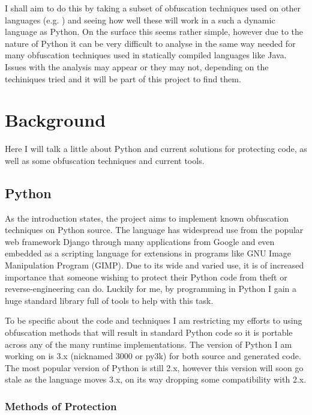 \documentclass{report}
\begin{document}
I shall aim to do this by taking a subset of obfuscation techniques used on other languages (e.g.
\cite{taxobftrans}) and seeing how well these will work in a such a dynamic language as Python. On the
surface this seems rather simple, however due to the nature of Python it can be very difficult to analyse
\cite[p13]{staticanal} in the same way needed for many obfuscation techniques used in statically compiled
languages like Java. Issues with the analysis may appear or they may not, depending on the techiniques
tried and it will be part of this project to find them.

\section{Background}

Here I will talk a little about Python and current solutions for protecting code, as well as some
obfuscation techniques and current tools.

\subsection{Python}

As the introduction states, the project aims to implement known obfuscation techniques on Python source.
The language has widespread use from the popular web framework Django\cite{django} through many applications
from Google\cite{pygoogle} and even embedded as a scripting language for extensions in programs like GNU
Image Manipulation Program (GIMP)\cite{gimp}. Due to its wide and varied use, it is of increased importance
that someone wishing to protect their Python code from theft or reverse-engineering can do. Luckily for me,
by programming in Python I gain a huge standard library full of tools to help with this task. 

To be specific about the code and techniques I am restricting my efforts to using obfuscation methods that will
result in standard Python code so it is portable across any of the many runtime implementations. The version
of Python I am working on is 3.x (nicknamed 3000 or py3k) for both source and generated code. The most popular
version of Python is still 2.x, however this version will soon go stale as the language moves 3.x, on its way
dropping some compatibility with 2.x.

\subsubsection{Methods of Protection}
\end{document}
